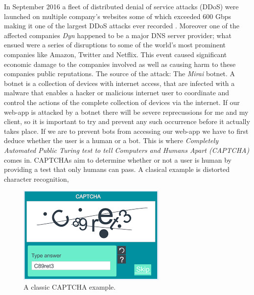 In September 2016 a fleet of distributed denial of service 
attacks (DDoS) were launched on multiple company's websites 
some of which exceeded 600 Gbps making it one of the largest 
DDoS attacks ever recorded \cite{mirai}. Moreover one of the 
affected companies \textit{Dyn} happened to be a major DNS
server provider; what ensued were a series of disruptions to 
some of the world's most prominent companies like Amazon, 
Twitter and Netflix. This event caused significant economic 
damage to the companies involved as well as causing harm to 
these companies public reputations. The source of the attack:
The \textit{Mirai} botnet. A botnet is a collection of 
devices with internet access, that are infected with a malware
that enables a hacker or malicious internet user to coordinate
and control the actions of the complete collection of devices
via the internet. If our web-app is attacked by a botnet 
there will be severe reprecussions for me and my client, so 
it is important to try and prevent any such occurrence before
it actually takes place. If we are to prevent bots from 
accessing our web-app we have to first deduce whether the user
is a human or a bot. This is where \textit{Completely
Automated Public Turing test to tell Computers and Humans
Apart (CAPTCHA)} comes in. CAPTCHAs aim to determine whether
or not a user is human by providing a test that only humans 
can pass. A clasical example is distorted character 
recognition,

\begin{figure}[h]
  \centering
  \includegraphics[scale=0.75]{Images/Captcha.png}
  \caption{A classic CAPTCHA example.}
\end{figure}

